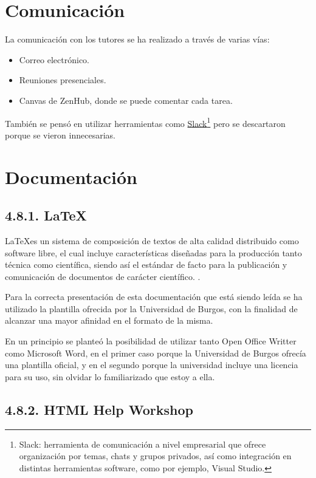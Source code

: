 \section{Comunicación}

La comunicación con los tutores se ha realizado a través de varias vías:
\begin{itemize}
	\item Correo electrónico.
	\item Reuniones presenciales. 
	\item Canvas de ZenHub, donde se puede comentar cada tarea.
\end{itemize}

También se pensó en utilizar herramientas como \href{https://slack.com/intl/es-es/}{Slack}\footnote{Slack: herramienta de comunicación a nivel empresarial que ofrece organización por temas, chats y grupos privados, así como integración en distintas herramientas software, como por ejemplo, Visual Studio.} pero se descartaron porque se vieron innecesarias.

\section{Documentación}

\subsection{4.8.1. LaTeX}

\LaTeX es un sistema de composición de textos de alta calidad distribuido como software libre, el cual incluye características diseñadas para la producción tanto técnica como científica, siendo así el estándar de facto para la publicación y comunicación de documentos de carácter científico. \cite{web:latex}.

Para la correcta presentación de esta documentación que está siendo leída se ha utilizado la plantilla ofrecida por la Universidad de Burgos, con la finalidad de alcanzar una mayor afinidad en el formato de la misma.

En un principio se planteó la posibilidad de utilizar tanto Open Office Writter como Microsoft Word, en el primer caso porque la Universidad de Burgos ofrecía una plantilla oficial, y en el segundo porque la universidad incluye una licencia para su uso, sin olvidar lo familiarizado que estoy a ella.

\subsection{4.8.2. HTML Help Workshop}

